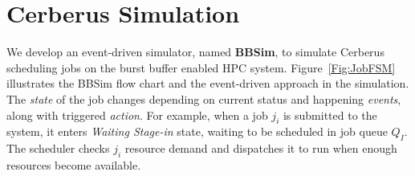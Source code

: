 

\section{Cerberus Simulation}
\label{Sec:Simulation}

We develop an event-driven simulator, named \textbf{BBSim},
to simulate Cerberus scheduling jobs on the burst buffer enabled HPC system.
Figure~\ref{Fig:JobFSM} illustrates the BBSim flow chart and the event-driven approach in the simulation.
The \textit{state} of the job changes depending on current status and
happening \textit{events}, along with triggered \textit{action}.
For example, when a job $j_i$ is submitted to the system, 
it enters \textit{Waiting Stage-in} state, 
waiting to be scheduled in job queue $Q_I$. 
The scheduler checks $j_i$ resource demand and 
dispatches it to run when enough resources become available.


